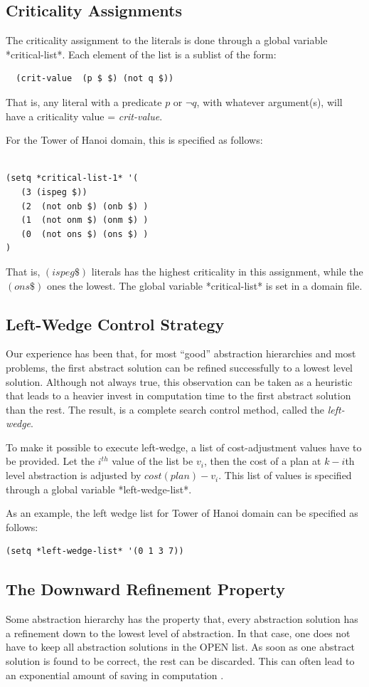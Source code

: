 \subsection{Criticality Assignments}
The criticality assignment to the literals is done through a global
variable *critical-list*.  Each element of the list is a sublist of
the form:
\begin{verbatim}
  (crit-value  (p $ $) (not q $))
\end{verbatim}
That is, any literal with a predicate $p$ or $\neg q$, with whatever
argument(s), will have a criticality value = {\em crit-value}.

For the Tower of Hanoi domain, this is specified as follows:
\begin{verbatim}

(setq *critical-list-1* '(
   (3 (ispeg $))
   (2  (not onb $) (onb $) )
   (1  (not onm $) (onm $) )
   (0  (not ons $) (ons $) )
)
\end{verbatim}
That is, $(ispeg \$)$ literals has the highest criticality in this
assignment, while the $(ons \$)$ ones the lowest.
The global variable *critical-list* is set in a domain file.

\subsection{Left-Wedge Control Strategy}
Our experience has been that, for most ``good'' abstraction
hierarchies and most problems, the first abstract solution can be
refined successfully to a lowest level solution.  Although not always
true, this observation can be taken as a heuristic that leads to a
heavier invest in computation time to the first abstract solution than
the rest.  The result, is a complete search control method, called the
{\em left-wedge}.

To make it possible to execute left-wedge, a list of cost-adjustment
values have to be provided.  Let the $i^{th}$ value of the list be $v_i$,
then the cost of a plan at $k-i$th level abstraction is adjusted by $cost(plan)-v_i$.
This list of values is specified through a global variable *left-wedge-list*.

As an example, the left wedge list for Tower of Hanoi domain can be
specified as follows:
\begin{verbatim}
(setq *left-wedge-list* '(0 1 3 7))
\end{verbatim}

\subsection{The Downward Refinement Property}
Some abstraction hierarchy has the property that, every abstraction
solution has a refinement down to the lowest level of abstraction.  In
that case, one does not have to keep all abstraction solutions in the
OPEN list.  As soon as one abstract solution is found to be correct,
the rest can be discarded.  This can often lead to an exponential amount of
saving in computation \cite{downward}.

